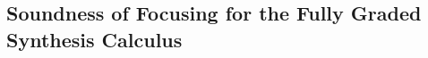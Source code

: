 \subsection{Soundness of Focusing for the Fully Graded Synthesis Calculus}
\label{proof:focus-graded-sound}
\gradedBaseFocusingSoundness*
